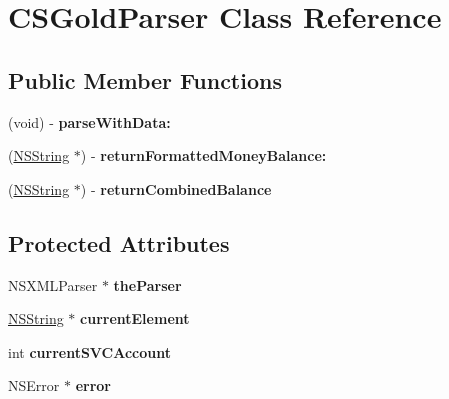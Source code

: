 \hypertarget{interface_c_s_gold_parser}{
\section{CSGoldParser Class Reference}
\label{interface_c_s_gold_parser}
}
\subsection*{Public Member Functions}
\begin{DoxyCompactItemize}
\item 
\hypertarget{interface_c_s_gold_parser_af8d3216c7f314bf898af16b68e2534b3}{
(void) -\/ {\bfseries parseWithData:}}
\label{interface_c_s_gold_parser_af8d3216c7f314bf898af16b68e2534b3}

\item 
\hypertarget{interface_c_s_gold_parser_a40a8cd014997e34e273ef8981426d3cd}{
(\hyperlink{class_n_s_string}{NSString} $\ast$) -\/ {\bfseries returnFormattedMoneyBalance:}}
\label{interface_c_s_gold_parser_a40a8cd014997e34e273ef8981426d3cd}

\item 
\hypertarget{interface_c_s_gold_parser_a8d8b1b290cc905ad88cd1b42a212c075}{
(\hyperlink{class_n_s_string}{NSString} $\ast$) -\/ {\bfseries returnCombinedBalance}}
\label{interface_c_s_gold_parser_a8d8b1b290cc905ad88cd1b42a212c075}

\end{DoxyCompactItemize}
\subsection*{Protected Attributes}
\begin{DoxyCompactItemize}
\item 
\hypertarget{interface_c_s_gold_parser_aa50e39a7684a23e915a1e5352e8d16ae}{
NSXMLParser $\ast$ {\bfseries theParser}}
\label{interface_c_s_gold_parser_aa50e39a7684a23e915a1e5352e8d16ae}

\item 
\hypertarget{interface_c_s_gold_parser_ae0d26bc14c1e0f25ee15b9ffcec3b003}{
\hyperlink{class_n_s_string}{NSString} $\ast$ {\bfseries currentElement}}
\label{interface_c_s_gold_parser_ae0d26bc14c1e0f25ee15b9ffcec3b003}

\item 
\hypertarget{interface_c_s_gold_parser_a58a4c48ec932d3e7541feb50bbdd93e9}{
int {\bfseries currentSVCAccount}}
\label{interface_c_s_gold_parser_a58a4c48ec932d3e7541feb50bbdd93e9}

\item 
\hypertarget{interface_c_s_gold_parser_ae3119ecd6a7679a31cb19b8bd05b90ba}{
NSError $\ast$ {\bfseries error}}
\label{interface_c_s_gold_parser_ae3119ecd6a7679a31cb19b8bd05b90ba}

\end{DoxyCompactItemize}
